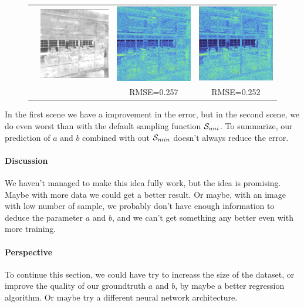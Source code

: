 \documentclass{classeENS}
\begin{document}
\begin{figure}[H]
\begin{tabular}{|c|c|c|c|}
        & \includegraphics[width=35mm]{image/without/ppsm.png}
        & \includegraphics[width=35mm]{image/without/ppp.png}
        & \includegraphics[width=35mm]{image/without/pp_norm.png} \\
         &  & RMSE=0.257 & RMSE=0.252 \\
        \hline
    \end{tabular}
\end{figure}
In the first scene we have a improvement in the error, but in the second scene, we do 
even worst than with the default sampling function $\mathcal S_{uni}$. To summarize, our
prediction of $a$ and $b$ combined with out $\mathcal S_{min}$ doesn't always reduce 
the error.

\paragraph*{Discussion} We haven't managed to make this idea fully work, 
 but the idea is promising. Maybe with more data we could get a better result. 
 Or maybe, with an image with low number of sample, we probably don't have 
 enough information to deduce the parameter $a$ and $b$, and we can't get 
 something any better even with more training. 

\paragraph*{Perspective} To continue this section, we could have try to increass
the size of the dataset, or improve the quality of our groundtruth $a$ and $b$, by maybe 
a better regression algorithm. Or maybe try a different neural network architecture.
\end{document}
